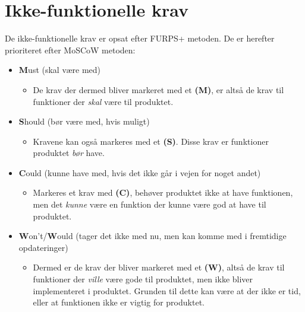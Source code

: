 \section{Ikke-funktionelle krav}
De ikke-funktionelle krav er opsat efter FURPS+ metoden. De er herefter prioriteret efter MoSCoW metoden:
\begin{itemize}
\item \textbf{M}ust (skal være med)
\begin{itemize}
\item De krav der dermed bliver markeret med et \textbf{(M)}, er altså de krav til funktioner der \textit{skal} være til produktet.
\end{itemize}
\item \textbf{S}hould (bør være med, hvis muligt)
\begin{itemize}
\item Kravene kan også markeres med et \textbf{(S)}. Disse krav er funktioner produktet \textit{bør} have.
\end{itemize}
\item \textbf{C}ould (kunne have med, hvis det ikke går i vejen for noget andet)
\begin{itemize}
\item Markeres et krav med \textbf{(C)}, behøver produktet ikke at have funktionen, men det \textit{kunne} være en funktion der kunne være god at have til produktet.
\end{itemize}
\item \textbf{W}on't/\textbf{W}ould (tager det ikke med nu, men kan komme med i fremtidige opdateringer)
\begin{itemize}
\item Dermed er de krav der bliver markeret med et \textbf{(W)}, altså de krav til funktioner der \textit{ville} være gode til produktet, men ikke bliver implementeret i produktet. Grunden til dette kan være at der ikke er tid, eller at funktionen ikke er vigtig for produktet.
\end{itemize}
\end{itemize}
